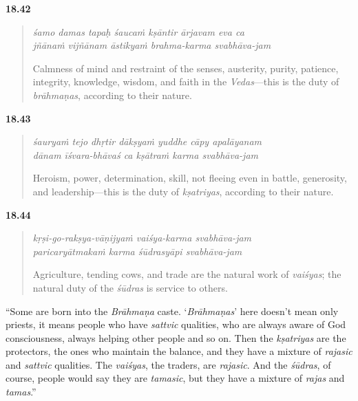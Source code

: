 \par\noindent\textbf{18.42}\par
\begin{verse}
\textit{śamo damas tapaḥ śaucaṁ kṣāntir ārjavam eva ca} \\
\textit{jñānaṁ vijñānam āstikyaṁ brahma-karma svabhāva-jam}

\noindent Calmness of mind and restraint of the senses, austerity, purity, patience, integrity, knowledge, wisdom, and faith in the \textit{Vedas}---this is the duty of \textit{brāhmaṇas}, according to their nature.
\end{verse}
\par



\par\noindent\textbf{18.43}\par
\begin{verse}
\textit{śauryaṁ tejo dhṛtir dākṣyaṁ yuddhe cāpy apalāyanam} \\
\textit{dānam īśvara-bhāvaś ca kṣātraṁ karma svabhāva-jam}

\noindent Heroism, power, determination, skill, not fleeing even in battle, generosity, and leadership---this is the duty of \textit{kṣatriyas}, according to their nature.
\end{verse}
\par



\par\noindent\textbf{18.44}\par
\begin{verse}
\textit{kṛṣi-go-rakṣya-vāṇijyaṁ vaiśya-karma svabhāva-jam} \\
\textit{paricaryātmakaṁ karma śūdrasyāpi svabhāva-jam}

\noindent Agriculture, tending cows, and trade are the natural work of \textit{vaiśyas}; the natural duty of the \textit{śūdras} is service to others.
\end{verse}
\par


\enquote{Some are born into the \textit{Brāhmaṇa} caste. \enquote{\textit{Brāhmaṇas}} here doesn’t mean only priests, it means people who have \textit{sattvic} qualities, who are always aware of God consciousness, always helping other people and so on. Then the \textit{kṣatriyas} are the protectors, the ones who maintain the balance, and they have a mixture of \textit{rajasic} and \textit{sattvic} qualities. The \textit{vaiśyas}, the traders, are \textit{rajasic}. And the \textit{śūdras}, of course, people would say they are \textit{tamasic}, but they have a mixture of \textit{rajas} and \textit{tamas}.}

